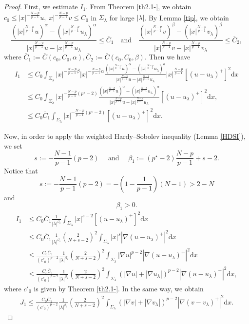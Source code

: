 \documentclass[12pt]{amsart}
\theoremstyle{definition}
\theoremstyle{remark}
\theoremstyle{conclusion}
\theoremstyle{conjecture}
\numberwithin{equation}{section}
\begin{document}
\begin{proof}
First, we estimate $I_1$. From Theorem \ref{th2.1-}, we obtain $c_0 \leq |x|^{-\frac{N-p}{p-1}}u, |x|^{-\frac{N-p}{p-1}}v \leq C_0 $ in $\Sigma_{\lambda}$ for large $|\lambda|$. By Lemma \ref{tip}, we obtain
$$\frac{(|x|^\frac{N-p}{p-1}u)^{\alpha}-(|x|^\frac{N-p}{p-1}u_\lambda)^{\alpha}}{|x|^\frac{N-p}{p-1}u-|x|^\frac{N-p}{p-1}u_\lambda} \leq \overline{C}_1\quad
\mbox{and} \quad
\frac{(|x|^\frac{N-p}{p-1}v)^{\beta}-(|x|^\frac{N-p}{p-1}v_\lambda)^{\beta}}{|x|^\frac{N-p}{p-1}v-|x|^\frac{N-p}{p-1}v_\lambda} \leq \overline{C}_2,$$
where $\overline{C}_1:=\overline{C}(c_0, C_0, \alpha), \overline{C}_2:=\overline{C}(c_0,C_0, \beta).$ Then we have
\begin{align}\label{eq0808}
I_1 &\leq C_0 \int_{\Sigma_\lambda} |x|^{-\frac{N-p}{p-1}\beta} |x|^{-\frac{N-p}{p-1}\alpha} \frac{(|x|^\frac{N-p}{p-1}u)^{\alpha}-(|x|^\frac{N-p}{p-1}u_\lambda)^{\alpha}}{|x|^\frac{N-p}{p-1}u-|x|^\frac{N-p}{p-1}u_\lambda} |x|^\frac{N-p}{p-1} [(u-u_\lambda)^+]^2 \mathrm{d}x \\
    &\leq C_0 \int_{\Sigma_\lambda} |x|^{-\frac{N-p}{p-1}(p^{\star}-2)}\frac{(|x|^\frac{N-p}{p-1}u)^{\alpha}-(|x|^\frac{N-p}{p-1}u_\lambda)^{\alpha}}{|x|^\frac{N-p}{p-1}u-|x|^\frac{N-p}{p-1}u_\lambda}  [(u-u_\lambda)^+]^2 \mathrm{d}x,\nonumber \\
    &\leq C_0 \overline{C}_1\int_{\Sigma_\lambda} |x|^{-\frac{N-p}{p-1}(p^{\star}-2)} [(u-u_\lambda)^+]^2 \mathrm{d}x. \nonumber
\end{align}

Now, in order to apply the weighted Hardy--Sobolev inequality (Lemma \ref{HDSI}), we set
$$ s:=-\frac{N-1}{p-1}(p-2)\quad\,\,\mbox{and}\quad\,\,\beta_1:=(p^\star -2)\frac{N-p}{p-1} +s-2.$$
Notice that
$$ s:=-\frac{N-1}{p-1}(p-2)=-\left(1-\frac{1}{p-1}\right)(N-1)>2-N$$
and
$$\beta_1 >0.$$
\begin{align}\label{eq0809}
I_1 &\leq C_0 \overline{C}_1 \frac{1}{|\lambda|^{\beta_1}} \int_{\Sigma_\lambda} |x|^{s-2} [(u-u_\lambda)^+]^2 \mathrm{d}x \\
&\leq C_0 \overline{C}_1 \frac{1}{|\lambda|^{\beta_1}} \left( \frac{2}{N+s-2} \right)^2 \int_{\Sigma_\lambda} |x|^s |\nabla(u-u_\lambda)^+|^2 \mathrm{d}x \nonumber\\
&\leq \frac{C_0 \overline{C}_1}{(c'_0)^{p-2}} \frac{1}{|\lambda|^{\beta_1}} \left( \frac{2}{N+s-2} \right)^2 \int_{\Sigma_\lambda} |\nabla u|^{p-2} |\nabla(u-u_\lambda)^+|^2 \mathrm{d}x \nonumber\\
&\leq \frac{C_0 \overline{C}_1}{(c'_0)^{p-2}} \frac{1}{|\lambda|^{\beta_1}} \left( \frac{2}{N+s-2} \right)^2 \int_{\Sigma_\lambda} \left(|\nabla u| +|\nabla u_\lambda|\right)^{p-2} |\nabla(u-u_\lambda)^+|^2 \mathrm{d}x, \nonumber
\end{align}
where $c'_0$ is given by Theorem \ref{th2.1-}. In the same way, we obtain
\begin{align}\label{eq0809-}
    J_1 \leq \frac{C_0 \overline{C}_1}{(c'_0)^{p-2}} \frac{1}{|\lambda|^{\beta_1}} \left( \frac{2}{N+s-2} \right)^2 \int_{\Sigma_\lambda} \left(|\nabla v| +|\nabla v_\lambda|\right)^{p-2} |\nabla(v-v_\lambda)^+|^2 \mathrm{d}x.
\end{align}


\end{proof}
\end{document}
